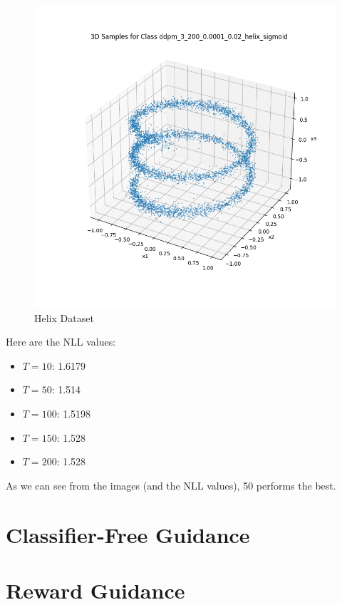 \documentclass[a4paper,12pt]{article}
\begin{document}
\begin{figure}[h]
\begin{minipage}{0.3\textwidth}
  \end{minipage}
  \begin{minipage}{0.3\textwidth}
      \centering
      \includegraphics[width=\linewidth]{"images/Samples for ddpm_3_200_0.0001_0.02_helix_sigmoid.png"}
  \end{minipage}

  \caption{Helix Dataset}
\end{figure}


Here are the NLL values:
\begin{itemize}
  \item $T = 10$: 1.6179
  \item $T = 50$: 1.514
  \item $T = 100$: 1.5198
  \item $T = 150$: 1.528
  \item $T = 200$: 1.528
\end{itemize}

As we can see from the images (and the NLL values), 50 performs the best.




\clearpage



\section*{Classifier-Free Guidance}


\section*{Reward Guidance}
\end{document}
